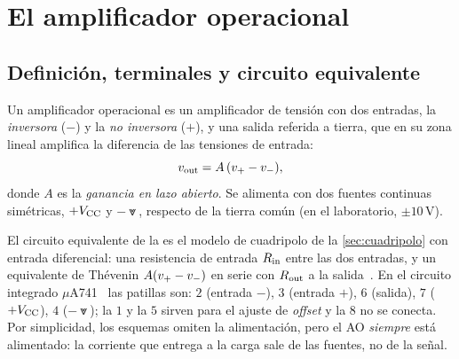 \section{El amplificador operacional}\label{sec:ao}
\subsection{Definición, terminales y circuito equivalente}\label{sec:ao-def}
\begin{definicion}\label{def:ao}
Un amplificador operacional es un amplificador de tensión con dos entradas, la \emph{inversora}
($-$) y la \emph{no inversora} ($+$), y una salida referida a tierra, que en su zona lineal
amplifica la diferencia de las tensiones de entrada:
\begin{equation}\label{eq:ao}
  v_{\mathrm{out}}=A\,(v_{+}-v_{-}),
\end{equation}
donde $A$ es la \emph{ganancia en lazo abierto}. Se alimenta con dos fuentes continuas simétricas,
$+V_{\mathrm{CC}}$ y $-\Vee$, respecto de la tierra común (en el laboratorio, $\pm10\,\mathrm{V}$).
\end{definicion}

El circuito equivalente de la  es el modelo de cuadripolo de la
\cref{sec:cuadripolo} con entrada diferencial: una resistencia de entrada $R_{\mathrm{in}}$ entre las dos
entradas, y un equivalente de Thévenin $A(v_{+}-v_{-})$ en serie con $R_{\mathrm{out}}$ a la salida~\cite{TEORIA-EA,SEDRA}.
En el circuito integrado $\mu$A741~\cite{UA741} las patillas son: $2$ (entrada $-$), $3$ (entrada $+$),
$6$ (salida), $7$ ($+V_{\mathrm{CC}}$), $4$ ($-\Vee$); la $1$ y la $5$ sirven para el ajuste de \emph{offset} y la $8$ no
se conecta. Por simplicidad, los esquemas omiten la alimentación, pero el AO \emph{siempre} está
alimentado: la corriente que entrega a la carga sale de las fuentes, no de la señal.



